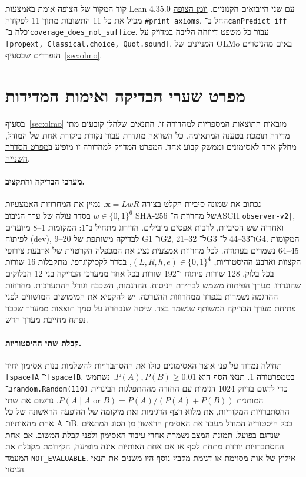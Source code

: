 \documentclass[11pt,a4paper]{article}
\DeclareRobustCommand{\textenglish}[1]{\foreignlanguage{english}{#1}}
\newcommand{\src}[2]{\href{https://github.com/Dnarts/rule110-dependency-fronts/blob/v2.2.1-monograph-multilingual/#1}{#2}}
\theoremstyle{definition}
\begin{document}
קוד המקור של הצופה אומת באמצעות \textenglish{Lean 4.35.0} עם שני הייבואים הקנוניים. \src{verification/monograph/observer-axioms.log}{יומן הצופה} מכיל את כל 11 התשובות מתוך 11 לפקודה \textenglish{\texttt{\#print axioms}}, החל ב־\textenglish{\texttt{canPredict\_iff}} וכלה ב־\textenglish{\texttt{coverage\_does\_not\_suffice}}. עבור כל משפט דיווחה הליבה במדויק על \textenglish{\texttt{[propext, Classical.choice, Quot.sound]}}. המניינים של \textenglish{OLMo} באים מהניסויים הנפרדים שבסעיף~\ref{sec:olmo}.

\section{מפרט שערי הבדיקה ואימות המדידות}
\label{app:gates}

בסעיף~\ref{sec:olmo} מובאות התוצאות המספריות למהדורה זו. התנאים שלהלן קובעים מתי מדידה תומכת בטענה המתאימה. כל השוואה מוגדרת עבור נקודת ביקורת אחת של המודל, מחלק אחד לאסימונים וממשק קבוע אחד. המפרט המדויק למהדורה זו מופיע ב\src{observer/gate_contract_ru.md}{מפרט הסדרה השנייה}.

\paragraph{מערכי הבדיקה והתקציב.}
נכתוב את שמונה סיביות הקלט בצורה $\mathbf{x}=LwR$. נמיין את המחרוזות האמצעיות $w\in\{0,1\}^6$ בסדר עולה של ערך הגיבוב \textenglish{SHA-256} של מחרוזת ה־\textenglish{ASCII} \verb!observer-v2|!, ואחריה שש הסיביות, לרבות אפסים מובילים. הדירוג מתחיל ב־1: המקומות \textenglish{1--8} מיועדים לפיתוח (\textenglish{dev}), \textenglish{9--20} לבדיקה משותפת של \textenglish{G1} ו־\textenglish{G2}, \textenglish{21--32} ל־\textenglish{G3} ו־\textenglish{33--44} ל־\textenglish{G4}. המקומות \textenglish{45--64} נשמרים בעתודה. לכל מחרוזת אמצעית נציג את המכפלה הקרטזית של ארבעת צירופי הקצוות וארבע ההיסטוריות, $(L,R,h,e)\in\{0,1\}^4$, בסדר לקסיקוגרפי. מתקבלות 16 שורות בכל בלוק, 128 שורות פיתוח ו־192 שורות בכל אחד ממערכי הבדיקה בני 12 הבלוקים שהוגדרו. מערך הפיתוח משמש לבחירת הניסוח, ההדגמות, השכבה וגודל ההתערבות. מחרוזות ההדגמה נשמרות בנפרד ממחרוזות ההערכה. יש להקפיא את המימושים המושווים לפני פתיחת מערך הבדיקה המשותף שנשמר בצד. שיטה שנבחרה על סמך תוצאות ממערך שכבר נפתח מחייבת מערך חדש.

\paragraph{קבלת שתי ההיסטוריות.}
תחילה נמדוד על פני אוצר האסימונים כולו את ההסתברויות להשלמות בנות אסימון יחיד \textenglish{\texttt{[space]A}} ו־\textenglish{\texttt{[space]B}}, בטמפרטורה 1. תנאי הסף הוא $P(A),P(B)\ge 0.01$. נשתמש ב־\textenglish{\texttt{random.Random(110)}} כדי לדגום בדיוק 1024 דגימות עם החזרה מההתפלגות הבינרית המותנית $P(A\mid A\text{ or }B)=P(A)/(P(A)+P(B))$. נרשום את שתי ההסתברויות המקוריות, את מלוא רצף הדגימות ואת מיקומה של ההופעה הראשונה של כל אחת מהאותיות \textenglish{A} ו־\textenglish{B}. בכל היסטוריה המודל מעבד את האסימון הראשון מן הסוג המתאים שנדגם בפועל. תמונת המצב נשמרת אחרי עיבוד האסימון ולפני קבלת המשוב. אם אחת ההסתברויות יורדת מתחת לסף או אם אחת האותיות אינה מופיעה, הקידומת מקבלת את המעמד \textenglish{\texttt{NOT\_EVALUABLE}}. אילוץ של אות מסוימת או דגימת מקבץ נוסף היו משנים את תנאי הניסוי.
\end{document}
